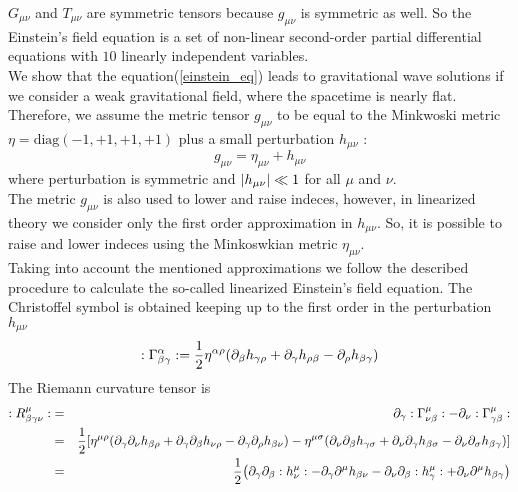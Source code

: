 $G_{\mu \nu}$ and $T_{\mu \nu}$ are symmetric tensors because $g_{\mu \nu}$ is symmetric as well.
So the Einstein's field equation is a set of non-linear second-order partial differential equations with $10$ linearly independent variables. \\
We show that the equation(\ref{einstein_eq}) leads to gravitational wave solutions if we consider a weak gravitational field, where the spacetime is nearly flat. 
Therefore, we assume the metric tensor $g_{\mu \nu}$ to be equal to the Minkwoski metric $\eta=\text{diag}(-1,+1,+1,+1)$ plus a small perturbation $h_{\mu \nu}$ :
\begin{equation}
\label{metric}
g_{\mu \nu} = \eta_{\mu \nu} + h_{\mu \nu}
\end{equation}
where perturbation is symmetric and $\abs{h_{\mu \nu}}\ll 1$ for all $\mu$ and $\nu$. \\
The metric $g_{\mu \nu}$ is also used to lower and raise indeces, however, in linearized theory we consider only the first order approximation in $h_{\mu \nu}$. So, it is possible to raise and lower indeces using the Minkoswkian metric $\eta_{\mu \nu}$.\\ %
Taking into account the mentioned approximations we follow the described procedure to calculate the so-called linearized Einstein's field equation.
The Christoffel symbol is obtained keeping up to the first order in the perturbation $h_{\mu \nu}$
\[
:\Gamma ^\alpha _{\beta \gamma}: = 
\dfrac{1}{2} \eta^{\alpha \rho}
\qty(
\partial_\beta h_{\gamma \rho } 
+
 \partial_\gamma h_{\rho \beta}
-
\partial_\rho h _{\beta \gamma}
) 
\]
The Riemann curvature tensor is 
\setlength{\jot}{10pt}
\begin{eqnarray}
:R^\mu _{\beta \gamma \de }: &=&  \notag
\partial_\gamma :\Gamma ^\mu _{\de \beta}: -
\partial_\de :\Gamma ^\mu _{\gamma \beta}: 
\\ \notag
&=& 
\dfrac{1}{2} 
\qty[
\eta^{\mu \rho} 
\qty(
\partial_\gamma \partial_\de h_{\beta \rho} + %
\partial_\gamma \partial_\beta h_{\de \rho} -
\partial_\gamma \partial_\rho h_{\beta \de}
)
-
\eta^{\mu \sigma} 
\qty(
\partial_\de \partial_\beta h_{\gamma \sigma} +
\partial_\de \partial_\gamma h_{\beta \sigma} - %
\partial_\de \partial_\sigma h_{\beta \gamma}
)
]
\\ 
&=&
\label{reimann_curvature_tensor_first_order}
\dfrac{1}{2} \qty(
\partial_\gamma \partial_\beta :h ^\mu _{\de}: -
\partial_\gamma \partial^\mu h_{\beta \de} -
\partial_\de \partial_\beta :h^\mu _{ \gamma} : +
\partial_\de \partial^\mu h_{\beta \gamma}
)
\end{eqnarray}
